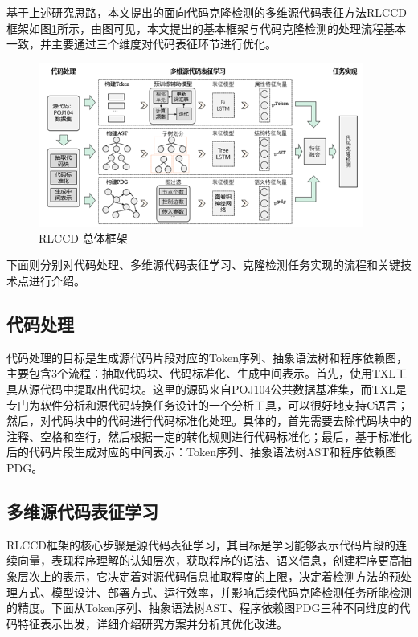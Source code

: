基于上述研究思路，本文提出的面向代码克隆检测的多维源代码表征方法RLCCD框架如图\ref{fig:framework}所示，由图可见，本文提出的基本框架与代码克隆检测的处理流程基本一致，并主要通过三个维度对代码表征环节进行优化。

\begin{figure}[H]
    \centering
    \includegraphics[width=0.95\textwidth]{figures/framework}
    \caption{RLCCD 总体框架}
    \label{fig:framework}
\end{figure}

下面则分别对代码处理、多维源代码表征学习、克隆检测任务实现的流程和关键技术点进行介绍。

\subsection{代码处理}
代码处理的目标是生成源代码片段对应的Token序列、抽象语法树和程序依赖图，主要包含3个流程：抽取代码块、代码标准化、生成中间表示。首先，使用TXL工具从源代码中提取出代码块。这里的源码来自POJ104公共数据基准集，而TXL是专门为软件分析和源代码转换任务设计的一个分析工具，可以很好地支持C语言；然后，对代码块中的代码进行代码标准化处理。具体的，首先需要去除代码块中的注释、空格和空行，然后根据一定的转化规则进行代码标准化；最后，基于标准化后的代码片段生成对应的中间表示：Token序列、抽象语法树AST和程序依赖图PDG。

\subsection{多维源代码表征学习}
RLCCD框架的核心步骤是源代码表征学习，其目标是学习能够表示代码片段的连续向量，表现程序理解的认知层次，获取程序的语法、语义信息，创建程序更高抽象层次上的表示，它决定着对源代码信息抽取程度的上限，决定着检测方法的预处理方式、模型设计、部署方式、运行效率，并影响后续代码克隆检测任务所能检测的精度。下面从Token序列、抽象语法树AST、程序依赖图PDG三种不同维度的代码特征表示出发，详细介绍研究方案并分析其优化改进。

